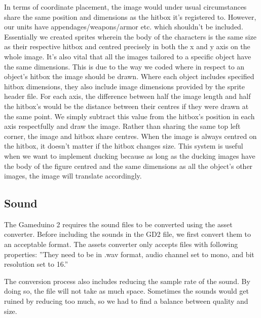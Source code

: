 In terms of coordinate placement, the image would under usual circumstances share the same position and dimensions as the hitbox it’s registered to. However, our units have appendages/weapons/armor etc. which shouldn’t be included. Essentially we created sprites wherein the body of the characters is the same size as their respective hitbox and centred precisely in both the x and y axis on the whole image. It’s also vital that all the images tailored to a specific object have the same dimensions. This is due to the way we coded where in respect to an object’s hitbox the image should be drawn. Where each object includes specified hitbox dimensions, they also include image dimensions provided by the sprite header file. For each axis, the difference between half the image length and half the hitbox’s would be the distance between their centres if they were drawn at the same point. We simply subtract this value from the hitbox’s position in each axis respectfully and draw the image. Rather than sharing the same top left corner, the image and hitbox share centres.  When the image is always centred on the hitbox, it doesn’t matter if the hitbox changes size. This system is useful when we want to implement ducking because as long as the ducking images have the body of the figure centred and the same dimensions as all the object’s other images, the image will translate accordingly.


\subsection{Sound}
The Gameduino 2 requires the sound files to be converted using the asset converter. Before including the
sounds in the GD2 file, we first convert them to an acceptable format. The assets converter only accepts
files with following properties: 
''They need to be in .wav format, audio channel set to mono, and bit resolution set to 16.''

The conversion process also includes reducing the sample rate of the sound. By doing so,
the file will not take as much space. Sometimes the sounds would get ruined by reducing too much,
so we had to find a balance between quality and size.


